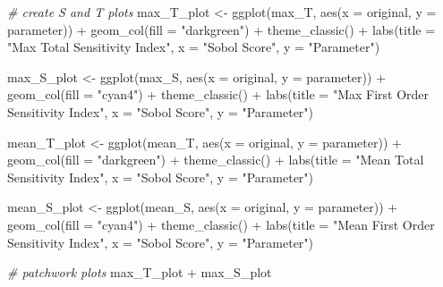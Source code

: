 \documentclass[
]{article}
\newenvironment{Shaded}{\begin{snugshade}}{\end{snugshade}}
\newcommand{\AttributeTok}[1]{\textcolor[rgb]{0.77,0.63,0.00}{#1}}
\newcommand{\CommentTok}[1]{\textcolor[rgb]{0.56,0.35,0.01}{\textit{#1}}}
\newcommand{\FunctionTok}[1]{\textcolor[rgb]{0.00,0.00,0.00}{#1}}
\newcommand{\NormalTok}[1]{#1}
\newcommand{\OtherTok}[1]{\textcolor[rgb]{0.56,0.35,0.01}{#1}}
\newcommand{\SpecialCharTok}[1]{\textcolor[rgb]{0.00,0.00,0.00}{#1}}
\newcommand{\StringTok}[1]{\textcolor[rgb]{0.31,0.60,0.02}{#1}}
\begin{document}
\begin{Shaded}
\begin{Highlighting}[]
\CommentTok{\# create S and T plots}
\NormalTok{max\_T\_plot }\OtherTok{\textless{}{-}} \FunctionTok{ggplot}\NormalTok{(max\_T, }\FunctionTok{aes}\NormalTok{(}\AttributeTok{x =}\NormalTok{ original, }\AttributeTok{y =}\NormalTok{ parameter)) }\SpecialCharTok{+}
  \FunctionTok{geom\_col}\NormalTok{(}\AttributeTok{fill =} \StringTok{"darkgreen"}\NormalTok{) }\SpecialCharTok{+}
  \FunctionTok{theme\_classic}\NormalTok{() }\SpecialCharTok{+}
  \FunctionTok{labs}\NormalTok{(}\AttributeTok{title =} \StringTok{"Max Total Sensitivity Index"}\NormalTok{,}
       \AttributeTok{x =} \StringTok{"Sobol Score"}\NormalTok{,}
       \AttributeTok{y =} \StringTok{"Parameter"}\NormalTok{)}

\NormalTok{max\_S\_plot }\OtherTok{\textless{}{-}} \FunctionTok{ggplot}\NormalTok{(max\_S, }\FunctionTok{aes}\NormalTok{(}\AttributeTok{x =}\NormalTok{ original, }\AttributeTok{y =}\NormalTok{ parameter)) }\SpecialCharTok{+}
  \FunctionTok{geom\_col}\NormalTok{(}\AttributeTok{fill =} \StringTok{"cyan4"}\NormalTok{) }\SpecialCharTok{+}
  \FunctionTok{theme\_classic}\NormalTok{() }\SpecialCharTok{+}
  \FunctionTok{labs}\NormalTok{(}\AttributeTok{title =} \StringTok{"Max First Order Sensitivity Index"}\NormalTok{,}
       \AttributeTok{x =} \StringTok{"Sobol Score"}\NormalTok{,}
       \AttributeTok{y =} \StringTok{"Parameter"}\NormalTok{)}

\NormalTok{mean\_T\_plot }\OtherTok{\textless{}{-}} \FunctionTok{ggplot}\NormalTok{(mean\_T, }\FunctionTok{aes}\NormalTok{(}\AttributeTok{x =}\NormalTok{ original, }\AttributeTok{y =}\NormalTok{ parameter)) }\SpecialCharTok{+}
  \FunctionTok{geom\_col}\NormalTok{(}\AttributeTok{fill =} \StringTok{"darkgreen"}\NormalTok{) }\SpecialCharTok{+}
  \FunctionTok{theme\_classic}\NormalTok{() }\SpecialCharTok{+}
  \FunctionTok{labs}\NormalTok{(}\AttributeTok{title =} \StringTok{"Mean Total Sensitivity Index"}\NormalTok{,}
       \AttributeTok{x =} \StringTok{"Sobol Score"}\NormalTok{,}
       \AttributeTok{y =} \StringTok{"Parameter"}\NormalTok{)}

\NormalTok{mean\_S\_plot }\OtherTok{\textless{}{-}} \FunctionTok{ggplot}\NormalTok{(mean\_S, }\FunctionTok{aes}\NormalTok{(}\AttributeTok{x =}\NormalTok{ original, }\AttributeTok{y =}\NormalTok{ parameter)) }\SpecialCharTok{+}
  \FunctionTok{geom\_col}\NormalTok{(}\AttributeTok{fill =} \StringTok{"cyan4"}\NormalTok{) }\SpecialCharTok{+}
  \FunctionTok{theme\_classic}\NormalTok{() }\SpecialCharTok{+}
  \FunctionTok{labs}\NormalTok{(}\AttributeTok{title =} \StringTok{"Mean First Order Sensitivity Index"}\NormalTok{,}
       \AttributeTok{x =} \StringTok{"Sobol Score"}\NormalTok{,}
       \AttributeTok{y =} \StringTok{"Parameter"}\NormalTok{)}

\CommentTok{\# patchwork plots}
\NormalTok{max\_T\_plot }\SpecialCharTok{+}\NormalTok{ max\_S\_plot}
\end{Highlighting}
\end{Shaded}
\end{document}
